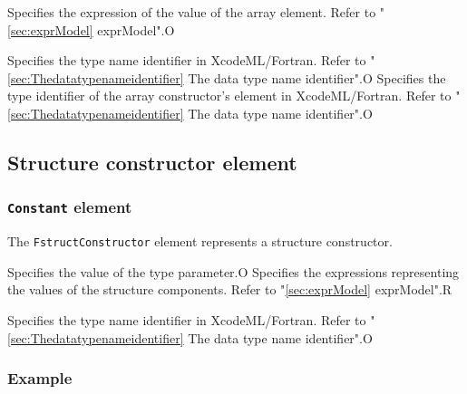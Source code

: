 \begin{XcodeMLChildElements}
{Specifies the expression of the value of the array element. Refer to "\ref{sec:exprModel} exprModel".}{O}
\end{XcodeMLChildElements}

\begin{XcodeMLAttributes}
{Specifies the type name identifier in XcodeML/Fortran.
 Refer to "\ref{sec:Thedatatypenameidentifier} The data type name identifier".}{O}
{Specifies the type identifier of the array constructor's element in XcodeML/Fortran.
 Refer to "\ref{sec:Thedatatypenameidentifier} The data type name identifier".}{O}
\end{XcodeMLAttributes}


\subsection{Structure constructor element}

\subsubsection{ {\tt Constant} element}

The {\tt FstructConstructor} element represents a structure constructor.


\begin{XcodeMLChildElements}
{Specifies the value of the type parameter.}{O}
{Specifies the expressions representing the values of the structure components. Refer to "\ref{sec:exprModel} exprModel".}{R}
\end{XcodeMLChildElements}

\begin{XcodeMLAttributes}
{Specifies the type name identifier in XcodeML/Fortran.
 Refer to "\ref{sec:Thedatatypenameidentifier} The data type name identifier".}{O}
\end{XcodeMLAttributes}

\subsubsection*{Example}


